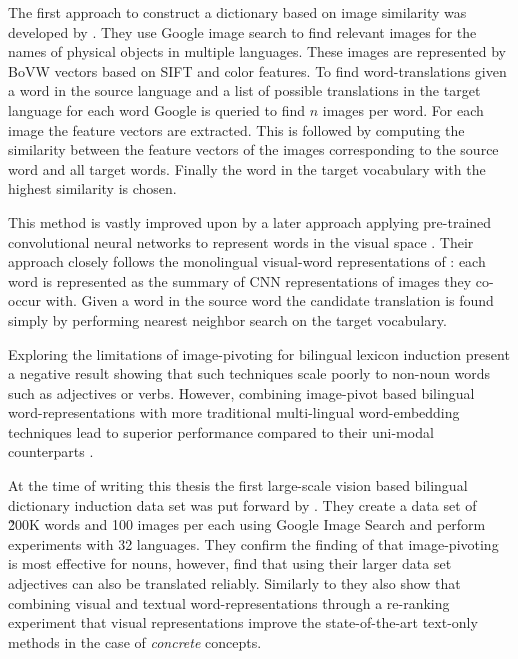 The first approach to construct a dictionary based on image similarity was
developed by \cite{bergsma2011learning}. They use Google image search to find
relevant images for the names of physical objects in multiple languages.
These images are represented by BoVW vectors based
on SIFT and color features. To find word-translations given a word in the
source language and a list of possible translations in the target language
for each word Google is queried to find $n$ images per word. For each image the
feature vectors are extracted. This is followed by computing the similarity
between the feature vectors of the images corresponding to the source word and
all target words. Finally the word in the target vocabulary with the highest
similarity is chosen.

This method is vastly improved upon by a later approach applying
pre-trained convolutional neural networks to represent words
in the visual space \citep{kiela2015visual}. Their approach closely follows
the monolingual visual-word representations of \cite{kiela2014improving}:
each word is represented as the summary of CNN representations of images they
co-occur with. Given a word in the source word the candidate translation is found
simply by performing nearest neighbor search on the target vocabulary.

Exploring the limitations of image-pivoting for bilingual lexicon induction
\cite{hartmann2017limitations} present a negative result
showing that such techniques scale poorly to non-noun words such as
adjectives or verbs. However, combining image-pivot based bilingual
word-representations with more traditional multi-lingual word-embedding
techniques lead to superior performance compared to their uni-modal
counterparts \cite{vulic2016multi}.

At the time of writing this thesis
the first large-scale vision based bilingual dictionary induction data set
was put forward by \citep{hewitt2018learning}. They create a data set
of \~200K words and 100 images per each using Google Image Search and perform
experiments with 32 languages.
They confirm the finding of \cite{hartmann2017limitations} that image-pivoting
is most effective for nouns, however, find that using their larger data set
adjectives can also be translated reliably. Similarly to \cite{vulic2016multi}
they also show that combining
visual and textual word-representations through a re-ranking
experiment that visual representations improve the state-of-the-art
text-only methods in the case of \emph{concrete} concepts.

